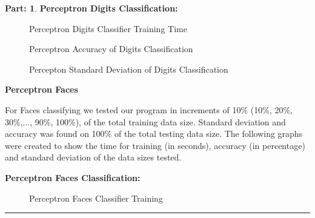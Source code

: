 \documentclass{article}
\theoremstyle{definition}
\def\fline{\rule{0.75\linewidth}{0.5pt}}
\newcommand{\finishline}{\begin{center}\fline\end{center}}
\newtheorem*{solution*}{Part: }
\newenvironment{solution}{\begin{solution*}}{{\finishline} \end{solution*}}
\begin{document}
\begin{solution}
\item \textbf{Perceptron Digits Classification:}
\begin{figure}[h!]
            \centering
            \item 
            \caption{Perceptron Digits Classifier Training Time}
        \end{figure}
\item
\begin{figure}[h!]
            \centering
            \item 
            \caption{Perceptron Accuracy of Digits Classification}
        \end{figure}
        
\item
\begin{figure}[h!]
            \centering
            \item 
            \caption{Percepton Standard Deviation of Digits Classification}
        \end{figure}

\begin{newpage}
\end{newpage}

\item \textbf{Perceptron Faces}
\item For Faces classifying we tested our program in increments of 10\% (10\%, 20\%, 30\%,..., 90\%, 100\%), of the total training data size. Standard deviation and accuracy was found on 100\% of the total testing data size. The following graphs were created to show the time for training (in seconds), accuracy (in percentage) and standard deviation of the data sizes tested. 

\begin{newpage}
\end{newpage}
\item \textbf{Perceptron Faces Classification:}

\begin{figure}[h!]
            \centering
            \item 
            \caption{Perceptron Faces Classifier Training}
        \end{figure}


\end{solution}
\end{document}

